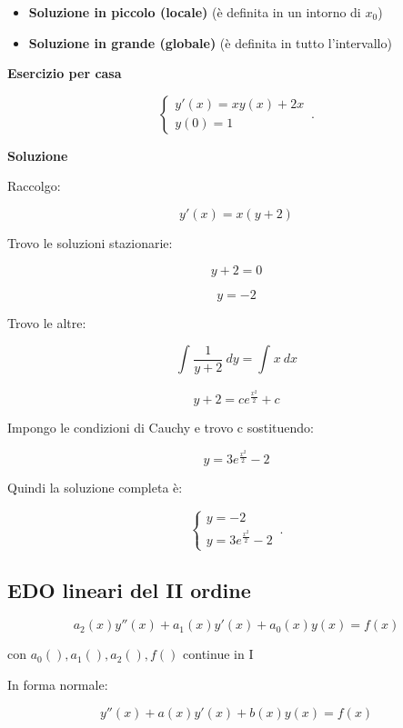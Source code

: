 \documentclass[11pt]{article}
\begin{document}
\begin{itemize}
    \item \textbf{ Soluzione in piccolo (locale) } (è definita in un intorno di $x_0$)
    \item \textbf{ Soluzione in grande (globale) } (è definita in tutto l'intervallo)
\end{itemize}

\textbf{Esercizio per casa}

\begin{equation}
    \begin{cases}
      y'(x) = xy(x)+2x\\
      y(0) = 1
    \end{cases}\,.
\end{equation}

\textbf{Soluzione} 

Raccolgo: 

\[
    y'(x)=x(y+2)
\]

Trovo le soluzioni stazionarie:

\[
    y+2=0
\]

\[
    y=-2
\]

Trovo le altre:

\[
    \int_{}^{} {\frac{1}{y+2}} \: dy = \int_{}^{} {x} \: dx 
\]

\[
    y+2 = c e ^{ \frac{x^{2}}{2}}+c
\]

Impongo le condizioni di Cauchy e trovo c sostituendo:

\[
    y=3e ^{ \frac{x^{2}}{2}}-2
\]

Quindi la soluzione completa è:

    \begin{equation}
        \begin{cases}
            y=-2\\
            y=3e ^{ \frac{x^{2}}{2}}-2
        \end{cases}\,.
    \end{equation}



\subsection{EDO lineari del II ordine}

\[
    a_2(x)y''(x) + a_1(x) y'(x) + a_0(x) y(x) = f(x)
\]

con $a_0(),a_1(),a_2(),f()$ continue in I

In forma normale:

\[
    y''(x) + a(x) y'(x) + b(x)y(x) = f(x)
\]
\end{document}
